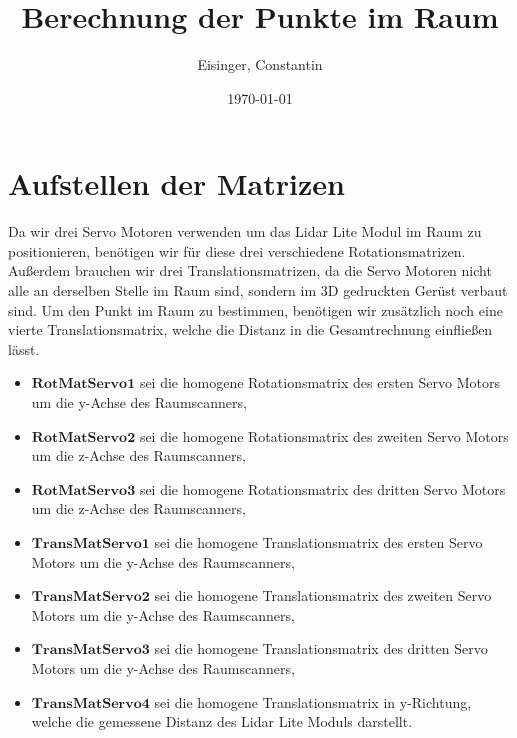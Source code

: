 \documentclass[a4paper,11pt,DIV11]{scrartcl}
\title{Berechnung der Punkte im Raum}
\author{Eisinger, Constantin}
\date{\today}
\begin{document}
\maketitle




\section{Aufstellen der Matrizen}
Da wir drei Servo Motoren verwenden um das Lidar Lite Modul im Raum zu positionieren, benötigen wir für diese drei verschiedene Rotationsmatrizen. Außerdem brauchen wir drei Translationsmatrizen, da die Servo Motoren nicht alle an derselben Stelle im Raum sind, sondern im 3D gedruckten Gerüst verbaut sind. Um den Punkt im Raum zu bestimmen, benötigen wir zusätzlich noch eine vierte Translationsmatrix, welche die Distanz in die Gesamtrechnung einfließen lässt.

\begin{itemize}
\item $\bm{RotMatServo1}$ sei die homogene Rotationsmatrix des ersten Servo Motors um die y-Achse des Raumscanners,
\item $\bm{RotMatServo2}$ sei die homogene Rotationsmatrix des zweiten Servo Motors um die z-Achse des Raumscanners,
\item $\bm{RotMatServo3}$ sei die homogene Rotationsmatrix des dritten Servo Motors um die z-Achse des Raumscanners,
\item $\bm{TransMatServo1}$ sei die homogene Translationsmatrix des ersten Servo Motors um die y-Achse des Raumscanners,
\item $\bm{TransMatServo2}$ sei die homogene Translationsmatrix des zweiten Servo Motors um die y-Achse des Raumscanners,
\item $\bm{TransMatServo3}$ sei die homogene Translationsmatrix des dritten Servo Motors um die y-Achse des Raumscanners,
\item $\bm{TransMatServo4}$ sei die homogene Translationsmatrix in y-Richtung, welche die gemessene Distanz des Lidar Lite Moduls darstellt.

\end{itemize}
\end{document}
